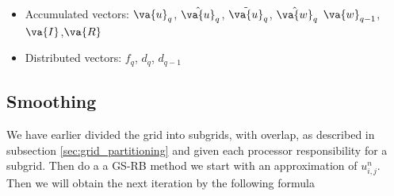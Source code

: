 		\begin{itemize}
			\item Accumulated vectors:	\(\va{u}_q\), \( \hat{\va{u}}_q \), \(\tilde{\va{u}}_q\), \(\hat{\va{w}}_q\) \(\va{w}_{q-1}\), \(\va{I}\),\(\va{R}\)
			\item Distributed vectors:  \( f_q \), \(d_q\), \(d_{q-1}\)
		\end{itemize}


	\subsection{Smoothing}

		We have earlier divided the grid into subgrids, with overlap, as described
		in subsection \ref{sec:grid_partitioning} and given each processor
		responsibility for a subgrid. Then do a a GS-RB method we start with an
		approximation of \(u^{n}_{i,j}\). Then we will obtain the next iteration by
		the following formula

